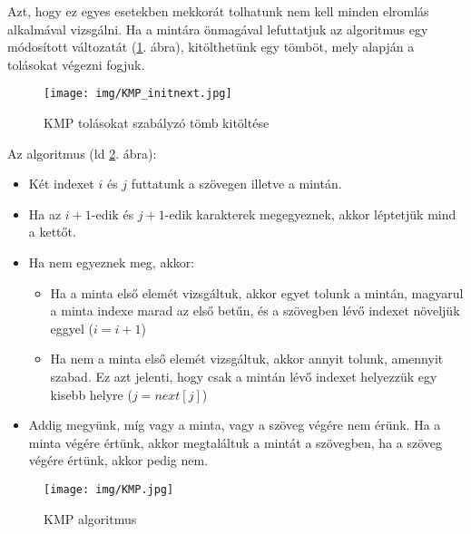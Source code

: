 \documentclass[margin=0px]{article}
\begin{document}
			Azt, hogy ez egyes esetekben mekkorát tolhatunk nem kell minden elromlás alkalmával vizsgálni. Ha a mintára önmagával lefuttatjuk az algoritmus egy módosított változatát (\ref{fig:KMP_initnext}. ábra), kitölthetünk egy tömböt, mely alapján a tolásokat végezni fogjuk.
			
			\begin{figure}[H]
				\centering
				\texttt{[image: img/KMP\_initnext.jpg]}
				\caption{KMP tolásokat szabályzó tömb kitöltése}
				\label{fig:KMP_initnext}
			\end{figure}
			
			Az algoritmus (ld \ref{fig:KMP}. ábra):
			\begin{itemize}
				\item Két indexet $i$ és $j$ futtatunk a szövegen illetve a mintán.
				\item Ha az $i+1$-edik és $j+1$-edik karakterek megegyeznek, akkor léptetjük mind a kettőt.
				\item Ha nem egyeznek meg, akkor:
					\begin{itemize}
						\item Ha a minta első elemét vizsgáltuk, akkor egyet tolunk a mintán, magyarul a minta indexe marad az első betűn, és a szövegben lévő indexet növeljük eggyel ($i=i+1$)
						\item Ha nem a minta első elemét vizsgáltuk, akkor annyit tolunk, amennyit szabad. Ez azt jelenti, hogy csak a mintán lévő indexet helyezzük egy kisebb helyre ($j = next[j]$)
					\end{itemize}
				\item Addig megyünk, míg vagy a minta, vagy a szöveg végére nem érünk. Ha a minta végére értünk, akkor megtaláltuk a mintát a szövegben, ha a szöveg végére értünk, akkor pedig nem.
			\end{itemize}
			
			\begin{figure}[H]
				\centering
				\texttt{[image: img/KMP.jpg]}
				\caption{KMP algoritmus}
				\label{fig:KMP}
			\end{figure}
\end{document}
